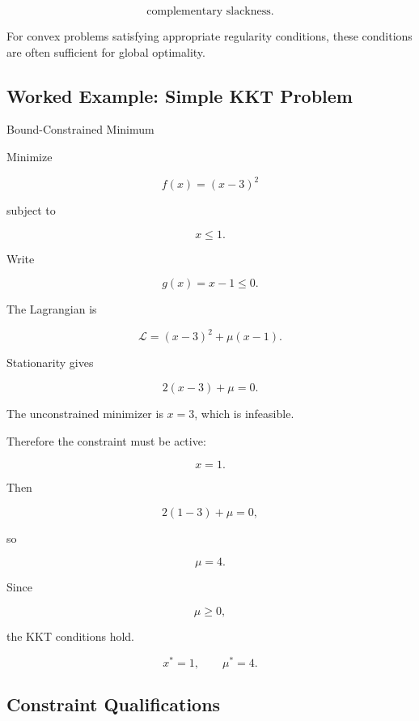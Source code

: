 \[
\boxed{
\text{complementary slackness}.
}
\]

For convex problems satisfying appropriate regularity conditions, these
conditions are often sufficient for global optimality.

\subsection{Worked Example: Simple KKT Problem}
\label{subsec:worked-kkt-problem}

\begin{workedexamplebox}{Bound-Constrained Minimum}

Minimize

\[
f(x)
=
(x-3)^2
\]

subject to

\[
x\leq1.
\]

Write

\[
g(x)=x-1\leq0.
\]

The Lagrangian is

\[
\mathcal{L}
=
(x-3)^2
+
\mu(x-1).
\]

Stationarity gives

\[
2(x-3)+\mu=0.
\]

The unconstrained minimizer is \(x=3\), which is infeasible.

Therefore the constraint must be active:

\[
x=1.
\]

Then

\[
2(1-3)+\mu=0,
\]

so

\[
\mu=4.
\]

Since

\[
\mu\geq0,
\]

the KKT conditions hold.

\begin{answerbox}
\[
\boxed{
x^*=1,
\qquad
\mu^*=4.
}
\]
\end{answerbox}

\end{workedexamplebox}

\subsection{Constraint Qualifications}
\label{subsec:constraint-qualifications}

